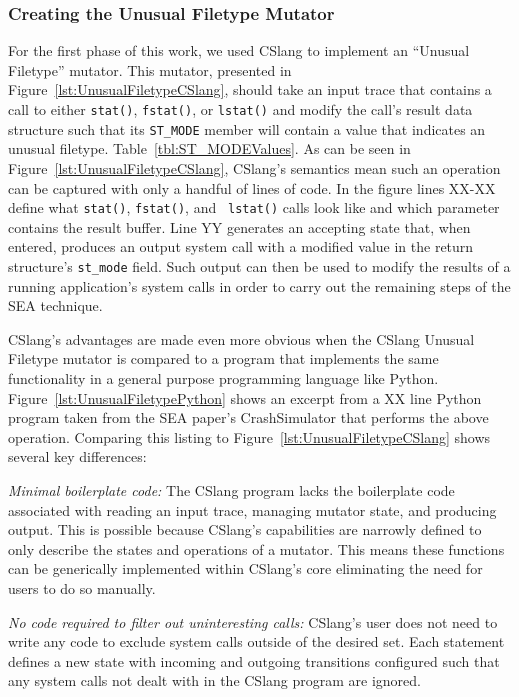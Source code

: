 \subsubsection{Creating the Unusual Filetype Mutator}
\label{subsub:UnusualFiletype}
For the first phase of this work,
we used CSlang to implement an ``Unusual Filetype''
mutator.
This mutator, presented in
Figure~\ref{lst:UnusualFiletypeCSlang},
should take an input trace
that contains a call to either {\tt stat()},
{\tt fstat()},
or {\tt lstat()}
and modify the call's result data structure such
that its {\tt ST\_MODE} member will contain a value
that indicates an unusual filetype.
Table~\ref{tbl:ST_MODEValues}.  As can be seen in
Figure~\ref{lst:UnusualFiletypeCSlang}, CSlang's semantics mean such an
operation can be captured with only a handful of lines of code.  In the
figure
lines XX-XX define what {\tt stat()}, {\tt fstat()}, and {\tt
lstat()} calls look like and which parameter contains the result buffer.
Line YY generates an accepting state that, when entered, produces an output
system call with a modified value in the return structure's {\tt st\_mode}
field.  Such output can then be used to modify the results of a running
application's system calls in order to carry out the remaining steps of the
SEA technique.

CSlang's advantages are made even more obvious when the CSlang Unusual
Filetype mutator is compared to a program that implements the same
functionality in a general purpose programming language like Python.
Figure~\ref{lst:UnusualFiletypePython} shows an excerpt from a XX line
Python program taken from the SEA paper's CrashSimulator that performs the
above operation.  Comparing this listing to
Figure~\ref{lst:UnusualFiletypeCSlang} shows several key differences:

\textit{Minimal boilerplate code:} The CSlang program lacks the boilerplate
code associated with
reading an input trace, managing mutator state, and producing output.
This is possible because CSlang's capabilities are narrowly defined to
only describe the states and operations of a mutator.  This means these
functions can be generically implemented within CSlang's core eliminating
the need for users to do so manually.

\textit{No code required to filter out uninteresting calls:}
CSlang's user does
not need to write any code to exclude system
calls outside of the desired set.  Each statement defines a new state with
incoming and outgoing transitions configured such that any system calls not
dealt with in the CSlang program are ignored.

